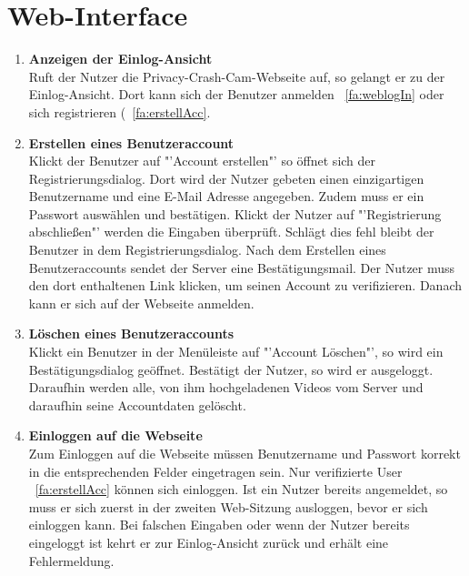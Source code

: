 \section{\gls{Web-Interface}}
\begin{enumerate}
\renewcommand{\labelenumi}{\textbf{\theenumi}}
\renewcommand{\theenumi}{FA\arabic{enumi}0}
\setcounter{enumi}{299}
\item \textbf{Anzeigen der Einlog-Ansicht} \hfill \\
Ruft der Nutzer die Privacy-Crash-Cam-Webseite auf, so gelangt er zu der Einlog-Ansicht. Dort kann sich der Benutzer anmelden ~\eqref{fa:weblogIn} oder sich registrieren (~\eqref{fa:erstellAcc}.

\item \label{fa:erstellAcc}\textbf{Erstellen eines Benutzeraccount} \hfill \\
Klickt der Benutzer auf "'Account erstellen"' so öffnet sich der Registrierungsdialog. Dort wird der Nutzer gebeten einen einzigartigen Benutzername und eine \gls{E-Mail} Adresse angegeben. Zudem muss er ein Passwort auswählen und bestätigen. Klickt der Nutzer auf "'Registrierung abschließen"' werden die Eingaben überprüft. Schlägt dies fehl bleibt der Benutzer in dem Registrierungsdialog. Nach dem Erstellen eines Benutzeraccounts sendet der Server eine Bestätigungsmail. Der Nutzer muss den dort enthaltenen Link klicken, um seinen Account zu verifizieren. Danach kann er sich auf der Webseite anmelden.

\item \label{fa:löschAcc}\textbf{Löschen eines Benutzeraccounts} \hfill \\
Klickt ein Benutzer in der Menüleiste auf "'Account Löschen"', so wird ein Bestätigungsdialog geöffnet. Bestätigt der Nutzer, so wird er ausgeloggt. Daraufhin werden alle, von ihm hochgeladenen Videos vom Server und daraufhin seine Accountdaten gelöscht.

\item \label{fa:weblogIn}\textbf{Einloggen auf die Webseite} \hfill \\
Zum Einloggen auf die Webseite müssen Benutzername und Passwort korrekt in die entsprechenden Felder eingetragen sein. Nur verifizierte User ~\eqref{fa:erstellAcc} können sich einloggen. Ist ein Nutzer bereits angemeldet, so muss er sich zuerst in der zweiten Web-Sitzung ausloggen, bevor er sich einloggen kann. Bei falschen Eingaben oder wenn der Nutzer bereits eingeloggt ist kehrt er zur Einlog-Ansicht zurück und erhält eine Fehlermeldung.


\end{enumerate}

